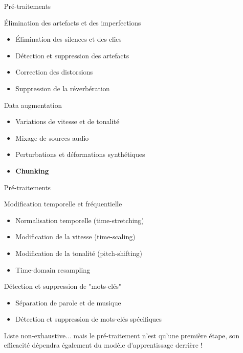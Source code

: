 \documentclass[compress,xcolor=table]{beamer}
\begin{document}
\begin{frame}{Pré-traitements}

    \begin{exampleblock}{Élimination des artefacts et des imperfections}
        \begin{itemize}
            \item Élimination des silences et des clics
            \item Détection et suppression des artefacts
            \item Correction des distorsions
            \item Suppression de la réverbération
        \end{itemize}
    \end{exampleblock}

    \begin{exampleblock}{Data augmentation}
        \begin{itemize}
            \item Variations de vitesse et de tonalité
            \item Mixage de sources audio
            \item Perturbations et déformations synthétiques
            \item \textbf{Chunking}
        \end{itemize}
    \end{exampleblock}

\end{frame}

\begin{frame}{Pré-traitements}

    \begin{exampleblock}{Modification temporelle et fréquentielle}
        \begin{itemize}
            \item Normalisation temporelle (time-stretching)
            \item Modification de la vitesse (time-scaling)
            \item Modification de la tonalité (pitch-shifting)
            \item Time-domain resampling
        \end{itemize}
    \end{exampleblock}

    \begin{exampleblock}{Détection et suppression de "mots-clés"}
        \begin{itemize}
            \item Séparation de parole et de musique
            \item Détection et suppression de mots-clés spécifiques
        \end{itemize}
    \end{exampleblock}

    Liste non-exhaustive... mais le pré-traitement n'est qu'une première étape, son efficacité dépendra également du modèle d'apprentissage derrière !

\end{frame}
\end{document}
